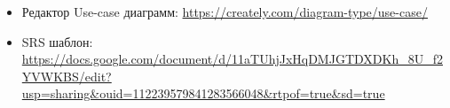 
\begin{itemize}
    \item Редактор Use-case диаграмм:
          \url{https://creately.com/diagram-type/use-case/}
    \item SRS шаблон:
          \url{https://docs.google.com/document/d/11aTUhjJxHqDMJGTDXDKh_8U_f2YVWKBS/edit?usp=sharing&ouid=112239579841283566048&rtpof=true&sd=true}
\end{itemize}
